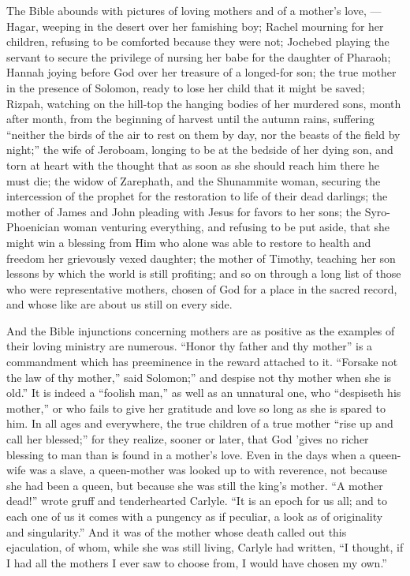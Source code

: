 \documentclass[
]{book}
\begin{document}
The Bible abounds with pictures of loving mothers and of a mother's love, --- Hagar, weeping in the desert over her famishing boy; Rachel mourning for her children, refusing to be comforted because they were not; Jochebed playing the servant to secure the privilege of nursing her babe for the daughter of Pharaoh; Hannah joying before God over her treasure of a longed-for son; the true mother in the presence of Solomon, ready to lose her child that it might be saved; Rizpah, watching on the hill-top the hanging bodies of her murdered sons, month after month, from the beginning of harvest until the autumn rains, suffering ``neither the birds of the air to rest on them by day, nor the beasts of the field by night;'' the wife of Jeroboam, longing to be at the bedside of her dying son, and torn at heart with the thought that as soon as she should reach him there he must die; the widow of Zarephath, and the Shunammite woman, securing the intercession of the prophet for the restoration to life of their dead darlings; the mother of James and John pleading with Jesus for favors to her sons; the Syro-Phoenician woman venturing everything, and refusing to be put aside, that she might win a blessing from Him who alone was able to restore to health and freedom her grievously vexed daughter; the mother of Timothy, teaching her son lessons by which the world is still profiting; and so on through a long list of those who were representative mothers, chosen of God for a place in the sacred record, and whose like are about us still on every side.

And the Bible injunctions concerning mothers are as positive as the examples of their loving ministry are numerous. ``Honor thy father and thy mother'' is a commandment which has preeminence in the reward attached to it. ``Forsake not the law of thy mother,'' said Solomon;'' and despise not thy mother when she is old.'' It is indeed a ``foolish man,'' as well as an unnatural one, who ``despiseth his mother,'' or who fails to give her gratitude and love so long as she is spared to him. In all ages and everywhere, the true children of a true mother ``rise up and call her blessed;'' for they realize, sooner or later, that God 'gives no richer blessing to man than is found in a mother's love. Even in the days when a queen-wife was a slave, a queen-mother was looked up to with reverence, not because she had been a queen, but because she was still the king's mother. ``A mother dead!'' wrote gruff and tenderhearted Carlyle. ``It is an epoch for us all; and to each one of us it comes with a pungency as if peculiar, a look as of originality and singularity.'' And it was of the mother whose death called out this ejaculation, of whom, while she was still living, Carlyle had written, ``I thought, if I had all the mothers I ever saw to choose from, I would have chosen my own.''
\end{document}
